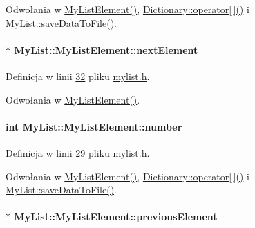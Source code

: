 Odwołania w \hyperlink{mylist_8cpp_source_l00017}{My\-List\-Element()}, \hyperlink{dictionary_8cpp_source_l00011}{Dictionary\-::operator\mbox{[}$\,$\mbox{]}()} i \hyperlink{mylist_8cpp_source_l00095}{My\-List\-::save\-Data\-To\-File()}.

\hypertarget{class_my_list_1_1_my_list_element_abd7af673552c8876f210cbea01c5e949}{
\paragraph[{next\-Element}]{$\ast$ My\-List\-::\-My\-List\-Element\-::next\-Element}}\label{class_my_list_1_1_my_list_element_abd7af673552c8876f210cbea01c5e949}


Definicja w linii \hyperlink{mylist_8h_source_l00032}{32} pliku \hyperlink{mylist_8h_source}{mylist.\-h}.



Odwołania w \hyperlink{mylist_8cpp_source_l00017}{My\-List\-Element()}.

\hypertarget{class_my_list_1_1_my_list_element_acd6dbb6a8791f034f94678d46395b366}{
\paragraph[{number}]{\setlength{\rightskip}{0pt plus 5cm}int My\-List\-::\-My\-List\-Element\-::number}}\label{class_my_list_1_1_my_list_element_acd6dbb6a8791f034f94678d46395b366}


Definicja w linii \hyperlink{mylist_8h_source_l00029}{29} pliku \hyperlink{mylist_8h_source}{mylist.\-h}.



Odwołania w \hyperlink{mylist_8cpp_source_l00017}{My\-List\-Element()}, \hyperlink{dictionary_8cpp_source_l00011}{Dictionary\-::operator\mbox{[}$\,$\mbox{]}()} i \hyperlink{mylist_8cpp_source_l00095}{My\-List\-::save\-Data\-To\-File()}.

\hypertarget{class_my_list_1_1_my_list_element_adb7c0cbde93a90f30484637498690d0f}{
\paragraph[{previous\-Element}]{$\ast$ My\-List\-::\-My\-List\-Element\-::previous\-Element}}\label{class_my_list_1_1_my_list_element_adb7c0cbde93a90f30484637498690d0f}


